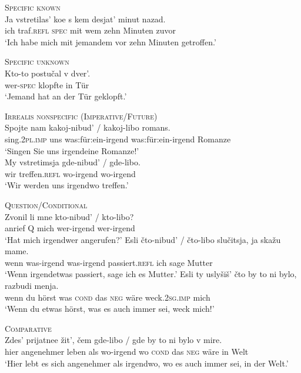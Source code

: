 \documentclass[output=paper, colorlinks, citecolor=brown, booklanguage=german]{langscibook}
\begin{document}
\begin{otherlanguage}{german}
\ea \textsc{Specific known}\\
    \gll Ja vstretilas' koe s kem desjat' minut nazad. \\
    ich traf.\textsc{refl} \textsc{spec} mit wem zehn Minuten zuvor \\ 
    \glt `Ich habe mich mit jemandem vor zehn Minuten getroffen.'
\z 

\newpage
\ea \textsc{Specific unknown}\\
    \gll Kto-to postučal v dver'. \\
        wer-\textsc{spec} klopfte in Tür \\
    \glt `Jemand hat an der Tür geklopft.'
\z 

\ea \textsc{Irrealis nonspecific (Imperative/Future)}\\
 \ea  \gll Spojte nam kakoj-nibud' / kakoj-libo romans.\\
    sing.2\textsc{pl}.\textsc{imp} uns was:für:ein-irgend {} was:für:ein-irgend Romanze \\
  \glt  `Singen Sie uns irgendeine Romanze!'\\
\ex  \gll  My vstretimsja gde-nibud' / gde-libo.\\
        wir treffen.\textsc{refl} wo-irgend {} wo-irgend \\ 
  \glt  `Wir werden uns irgendwo treffen.'
\z 
\z

\ea \textsc{Question/Conditional}\\
\ea  \gll  Zvonil li mne kto-nibud' / kto-libo?\\
           anrief Q mich wer-irgend {} wer-irgend \\ 
    \glt `Hat mich irgendwer angerufen?'
 \ex   \gll Esli čto-nibud' / čto-libo slučitsja, ja skažu mame.\\
    wenn was-irgend {} was-irgend passiert.\textsc{refl} ich sage Mutter \\
  \glt  `Wenn irgendetwas passiert, sage ich es Mutter.'
\ex   \gll Esli ty uslyšiš' čto by to ni bylo, razbudi menja.\\
    wenn du hörst was \textsc{cond} das \textsc{neg} wäre weck.2\textsc{sg}.\textsc{imp} mich \\
   \glt `Wenn du etwas hörst, was es auch immer sei, weck mich!'
\z 
\z 

\ea \textsc{Comparative}\\
    \gll Zdes' prijatnee žit', čem gde-libo / gde by to ni bylo v mire. \\
    hier angenehmer leben als wo-irgend {} wo \textsc{cond} das \textsc{neg} wäre in Welt \\
    \glt `Hier lebt es sich angenehmer als irgendwo, wo es auch immer sei, in der Welt.'
\z 


\end{otherlanguage}
\end{document}
